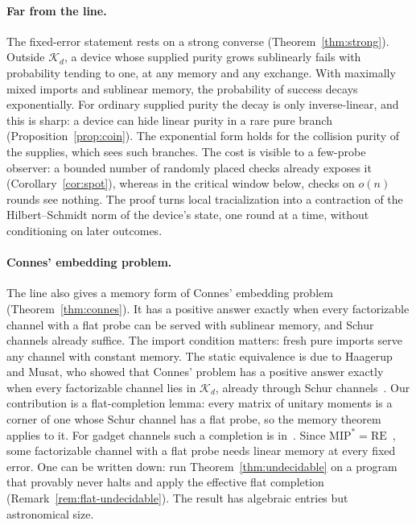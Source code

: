 \documentclass[11pt]{article}
\theoremstyle{definition}
\theoremstyle{remark}
\newcommand{\K}{\mathcal K}
\begin{document}
\paragraph{Far from the line.}
The fixed-error statement rests on a strong converse (Theorem~\ref{thm:strong}). Outside $\K_d$, a device whose supplied purity grows sublinearly fails with probability tending to one, at any memory and any exchange. With maximally mixed imports and sublinear memory, the probability of success decays exponentially. For ordinary supplied purity the decay is only inverse-linear, and this is sharp: a device can hide linear purity in a rare pure branch (Proposition~\ref{prop:coin}). The exponential form holds for the collision purity of the supplies, which sees such branches. The cost is visible to a few-probe observer: a bounded number of randomly placed checks already exposes it (Corollary~\ref{cor:spot}), whereas in the critical window below, checks on $o(n)$ rounds see nothing. The proof turns local tracialization into a contraction of the Hilbert--Schmidt norm of the device's state, one round at a time, without conditioning on later outcomes.

\paragraph{Connes' embedding problem.}
The line also gives a memory form of Connes' embedding problem (Theorem~\ref{thm:connes}). It has a positive answer exactly when every factorizable channel with a flat probe can be served with sublinear memory, and Schur channels already suffice. The import condition matters: fresh pure imports serve any channel with constant memory. The static equivalence is due to Haagerup and Musat, who showed that Connes' problem has a positive answer exactly when every factorizable channel lies in $\K_d$, already through Schur channels~\cite[Theorems~3.6 and~3.7]{HM2015}. Our contribution is a flat-completion lemma: every matrix of unitary moments is a corner of one whose Schur channel has a flat probe, so the memory theorem applies to it. For gadget channels such a completion is in~\cite[Proposition~J.2]{Memory}. Since $\mathrm{MIP}^*=\mathrm{RE}$~\cite{MIP}, some factorizable channel with a flat probe needs linear memory at every fixed error. One can be written down: run Theorem~\ref{thm:undecidable} on a program that provably never halts and apply the effective flat completion (Remark~\ref{rem:flat-undecidable}). The result has algebraic entries but astronomical size.
\end{document}
